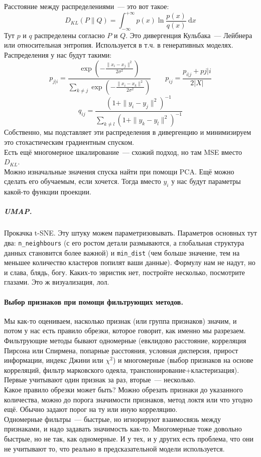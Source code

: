 \documentclass{article}
\begin{document}
    Расстояние между распределениями~--- это вот такое:
    \[
    D_{KL}(P\|Q)=\int_{-\infty}^{+\infty}p(x)\ln\frac{p(x)}{q(x)}~\mathrm dx
    \]
    Тут $p$ и $q$ распределены согласно $P$ и $Q$. Это дивергенция Кульбака~--- Лейбнера или относительная энтропия. Используется в т.ч. в генеративных моделях.\\
    Распределения у нас будут такими:
    \[
    p_{j|i}=\dfrac{\exp\left(-\frac{\|x_i-x_j\|^2}{2\sigma^2}\right)}{\sum\limits_{k\neq j}\exp\left(-\frac{\|x_i-x_k\|^2}{2\sigma^2}\right)}\qquad p_{ij}=\frac{p_{i|j}+p{j|i}}{2|X|}
    \]
    \[
    q_{ij}=\frac{\left(1+\|y_i-y_j\|^2\right)^{-1}}{\sum\limits_{k\neq l}\left(1+\|y_k-y_l\|^2\right)^{-1}}
    \]
    Собственно, мы подставляет эти распределения в дивергенцию и минимизируем это стохастическим градиентным спуском.\\
    Есть ещё многомерное шкалирование~--- схожий подход, но там MSE вместо $D_{KL}$.\\
    Можно изначальные значения спуска найти при помощи PCA. Ещё можно сделать его обучаемым, если хочется. Тогда вместо $y_i$ у нас будут параметры какой-то функции проекции.
    \subparagraph{UMAP.}
    Прокачка t-SNE. Эту штуку можем параметризовывать. Параметров основных тут два: \Verb|n_neighbours| (с его ростом детали размываются, а глобальная структура данных становится более важной) и \Verb|min_dist| (чем больше значение, тем на меньшее количество кластеров попилят ваши данные). Формулу нам не надут, но и слава, блядь, богу. Каких-то эвристик нет, постройте несколько, посмотрите глазами. Это ж визуализация, лол.
    \paragraph{Выбор признаков при помощи фильтрующих методов.}
    Мы как-то оцениваем, насколько признак (или группа признаков) значим, и потом у нас есть правило обрезки, которое говорит, как именно мы разрезаем.\\
    Фильтрующие методы бывают одномерные (евклидово расстояние, корреляция Пирсона или Спирмена, попарные расстояния, условная дисперсия, прирост информации, индекс Джини или $\chi^2$) и многомерные (выбор признаков на основе корреляций, фильтр марковского одеяла, транспонирование+кластеризация). Первые учитывают один признак за раз, вторые~--- несколько.\\
    Какое правило обрезки может быть? Можно обрезать признаки до указанного количества, можно до порога значимости признаков, метод локтя или что угодно ещё. Обычно задают порог на ту или иную корреляцию.\\
    Одномерные фильтры~--- быстрые, но игнорируют взаимосвязь между признаками, и надо задавать значимость как-то. Многомерные тоже довольно быстрые, но не так, как одномерные. И у тех, и у других есть проблема, что они не учитывают то, что реально в предсказательной модели используется. 
\end{document}
